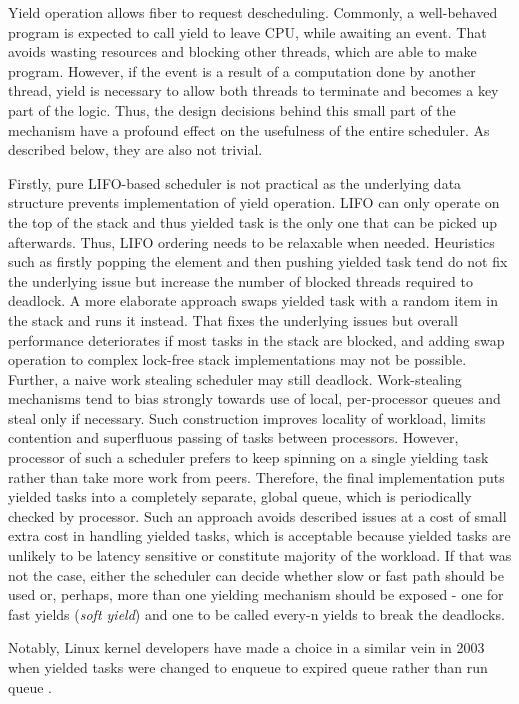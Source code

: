 \documentclass[12pt,a4paper,twoside]{report}
\begin{document}
Yield operation allows fiber to request descheduling. Commonly, a well-behaved program is expected to call yield to leave CPU, while awaiting an event. That avoids wasting resources and blocking other threads, which are able to make program. However, if the event is a result of a computation done by another thread, yield is necessary to allow both threads to terminate and becomes a key part of the logic. Thus, the design decisions behind this small part of the mechanism have a profound effect on the usefulness of the entire scheduler. As described below, they are also not trivial.

Firstly, pure LIFO-based scheduler is not practical as the underlying data structure prevents implementation of yield operation. LIFO can only operate on the top of the stack and thus yielded task is the only one that can be picked up afterwards. Thus, LIFO ordering needs to be relaxable when needed. Heuristics such as firstly popping the element and then pushing yielded task tend do not fix the underlying issue but increase the number of blocked threads required to deadlock. A more elaborate approach swaps yielded task with a random item in the stack and runs it instead. That fixes the underlying issues but overall performance deteriorates if most tasks in the stack are blocked, and adding swap operation to complex lock-free stack implementations may not be possible. Further, a naive work stealing scheduler may still deadlock. Work-stealing mechanisms tend to bias strongly towards use of local, per-processor queues and steal only if necessary. Such construction improves locality of workload, limits contention and superfluous passing of tasks between processors. However, processor of such a scheduler prefers to keep spinning on a single yielding task rather than take more work from peers. Therefore, the final implementation puts yielded tasks into a completely separate, global queue, which is periodically checked by processor. Such an approach avoids described issues at a cost of small extra cost in handling yielded tasks, which is acceptable because yielded tasks are unlikely to be latency sensitive or constitute majority of the workload. If that was not the case, either the scheduler can decide whether slow or fast path should be used or, perhaps, more than one yielding mechanism should be exposed - one for fast yields (\textit{soft yield}) and one to be called every-n yields to break the deadlocks. 

Notably, Linux kernel developers have made a choice in a similar vein in 2003 when yielded tasks were changed to enqueue to expired queue rather than run queue \cite{Theright8:online}. 
\end{document}
